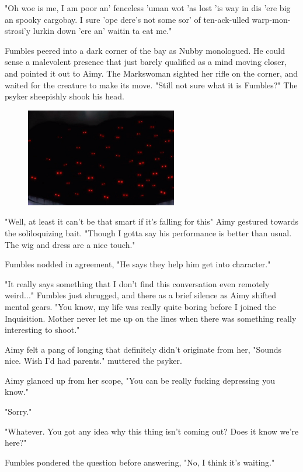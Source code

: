 "Oh woe is me, I am poor an' fenceless 'uman wot 'as lost 'is way in dis 'ere big an spooky cargobay. 
I sure 'ope dere's not some sor' of ten-ack-ulled warp-mon-strosi'y lurkin down 'ere an' waitin ta eat me."

Fumbles peered into a dark corner of the bay as Nubby monologued. 
He could sense a malevolent presence that just barely qualified as a mind moving closer, and pointed it out to Aimy. 
The Markswoman sighted her rifle on the corner, and waited for the creature to make its move. 
"Still not sure what it is Fumbles?" The psyker sheepishly shook his head.

\begin{figure}
	\begin{center}
		\includegraphics[width=\figwidth]{pics/13/4.png}
	\end{center}
\end{figure}
"Well, at least it can't be that smart if it's falling for this" Aimy gestured towards the soliloquizing bait. 
"Though I gotta say his performance is better than usual. 
The wig and dress are a nice touch."

Fumbles nodded in agreement, "He says they help him get into character."

"It really says something that I don't find this conversation even remotely weird..." Fumbles just shrugged, and there as a brief silence as Aimy shifted mental gears. 
"You know, my life was really quite boring before I joined the Inquisition. 
Mother never let me up on the lines when there was something really interesting to shoot."

Aimy felt a pang of longing that definitely didn't originate from her, "Sounds nice. 
Wish I'd had parents." muttered the psyker.

Aimy glanced up from her scope, "You can be really fucking depressing you know."

"Sorry."

"Whatever. 
You got any idea why this thing isn't coming out? 
Does it know we're here?"

Fumbles pondered the question before answering, "No, I think it's waiting."

